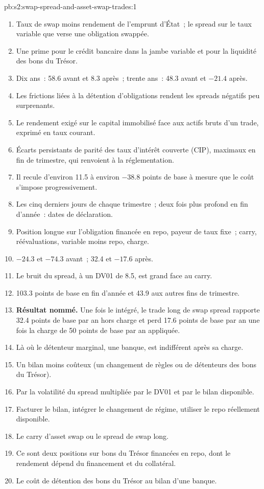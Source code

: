 \begin{solution}{pb:s2:swap-spread-and-asset-swap-trades:1}
\begin{enumerate}
\item Taux de swap moins rendement de l'emprunt d'État~; le spread sur le taux variable que verse une obligation swappée.
\item Une prime pour le crédit bancaire dans la jambe variable et pour la liquidité des bons du Trésor.
\item Dix ans~: 58.6 avant et 8.3 après~; trente ans~: 48.3 avant et $-21.4$ après.
\item Les frictions liées à la détention d'obligations rendent les spreads négatifs peu surprenants.
\item Le rendement exigé sur le capital immobilisé face aux actifs bruts d'un trade, exprimé en taux courant.
\item Écarts persistants de parité des taux d'intérêt couverte (CIP), maximaux en fin de trimestre, qui renvoient à la réglementation.
\item Il recule d'environ 11.5 à environ $-38.8$ points de base à mesure que le coût s'impose progressivement.
\item Les cinq derniers jours de chaque trimestre~; deux fois plus profond en fin d'année~: dates de déclaration.
\item Position longue sur l'obligation financée en repo, payeur de taux fixe~; carry, réévaluations, variable moins repo, charge.
\item $-24.3$ et $-74.3$ avant~; 32.4 et $-17.6$ après.
\item Le bruit du spread, à un DV01 de 8.5, est grand face au carry.
\item 103.3 points de base en fin d'année et 43.9 aux autres fins de trimestre.
\item \textbf{Résultat nommé.} Une fois le  intégré, le trade long de swap spread rapporte 32.4 points de base par an hors charge et perd 17.6
points de base par an une fois la charge de 50 points de base par an appliquée.
\item Là où le détenteur marginal, une banque, est indifférent après sa charge.
\item Un bilan moins coûteux (un changement de règles ou de détenteurs des bons du Trésor).
\item Par la volatilité du spread multipliée par le DV01 et par le bilan disponible.
\item Facturer le bilan, intégrer le changement de régime, utiliser le repo réellement disponible.
\item Le carry d'asset swap ou le spread de swap long.
\item Ce sont deux positions sur bons du Trésor financées en repo, dont le rendement dépend du financement et du collatéral.
\item Le coût de détention des bons du Trésor au bilan d'une banque.
\end{enumerate}
\end{solution}

